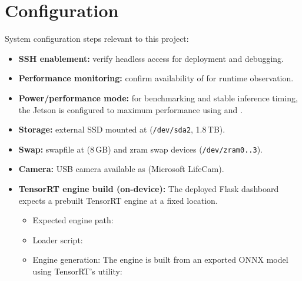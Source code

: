 \section{Configuration}
\noindent
System configuration steps relevant to this project:
\begin{itemize}
	\item \textbf{SSH enablement:} verify headless access for deployment and debugging.
	
	\item \textbf{Performance monitoring:} confirm availability of  for runtime observation.
	
	\item \textbf{Power/performance mode:}  
	for benchmarking and stable inference timing, the Jetson is configured to maximum performance using
	 and .
	
	\item \textbf{Storage:}  
	external SSD mounted at  (\texttt{/dev/sda2}, 1.8\,TB).
	
	\item \textbf{Swap:}  
	swapfile at  (8\,GB) and zram swap devices
	(\texttt{/dev/zram0..3}).
	
	\item \textbf{Camera:}  
	USB camera available as  (Microsoft LifeCam).
	
	\item \textbf{TensorRT engine build (on-device):}  
	The deployed Flask dashboard expects a prebuilt TensorRT engine at a fixed location.
	
	{\sloppy\small
		\begin{itemize}
			\item Expected engine path:  
			
			\item Loader script:  
			
			\item Engine generation:  
			The engine is built from an exported ONNX model using TensorRT’s  utility:
			
		\end{itemize}
	}
\end{itemize}

